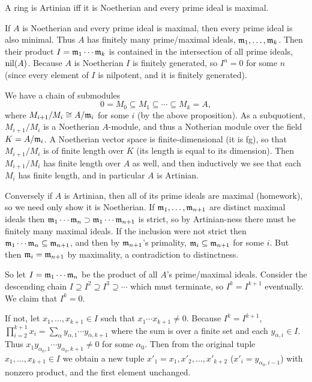 \eproof

\bprop

    A ring is Artinian iff it is Noetherian and every prime ideal is maximal.

\eprop

\bproof

    If $A$ is Noetherian and every prime ideal is maximal, then every prime ideal is also minimal.
    Thus $A$ has finitely many prime/maximal ideals, ${{\frak m}}_1,\dots,{{\frak m}}_k$.
    Then their product $I={{\frak m}}_1\cdots{{\frak m}}_k$ is contained in the intersection of all prime ideals, ${\rm nil}(A)$.
    Because $A$ is Noetherian $I$ is finitely generated, so $I^n=0$ for some $n$ (since every element of $I$ is nilpotent, and it is finitely generated).

    We have a chain of submodules
    $$ 0 = M_0 \subseteq M_1 \subseteq \cdots \subseteq M_k = A , $$
    where $M_{i+1}/M_i\cong A/{{\frak m}}_i$ for some $i$ (by the above proposition).
    As a subquotient, $M_{i+1}/M_i$ is a Noetherian $A$-module, and thus a Notherian module over the field $K=A/{{\frak m}}_i$.
    A Noetherian vector space is finite-dimensional (it is fg), so that $M_{i+1}/M_i$ is of finite length over $K$ (its length is equal to its dimension).
    Then $M_{i+1}/M_i$ has finite length over $A$ as well, and then inductively we see that each $M_i$ has finite length, and in particular $A$ is Artinian.

    Conversely if $A$ is Artinian, then all of its prime ideals are maximal (homework), so we need only show it is Noetherian.
    If ${{\frak m}}_1,\dots,{{\frak m}}_{n+1}$ are distinct maximal ideals then ${{\frak m}}_1\cdots{{\frak m}}_n\supset{{\frak m}}_1\cdots{{\frak m}}_{n+1}$ is strict, so by Artinian-ness there must be finitely many maximal ideals.
    If the inclusion were not strict then ${{\frak m}}_1\cdots{{\frak m}}_n\subseteq{{\frak m}}_{n+1}$, and then by ${{\frak m}}_{n+1}$'s primality, ${{\frak m}}_i\subseteq{{\frak m}}_{n+1}$ for some $i$.
    But then ${{\frak m}}_i={{\frak m}}_{n+1}$ by maximality, a contradiction to distinctness.

    So let $I={{\frak m}}_1\cdots{{\frak m}}_n$ be the product of all $A$'s prime/maximal ideals.
    Consider the descending chain $I\supseteq I^2\supseteq I^3\supseteq\cdots$ which must terminate, so $I^k=I^{k+1}$ eventually.
    We claim that $I^k=0$.

    If not, let $x_1,\dots,x_{k+1}\in I$ such that $x_1\cdots x_{k+1}\neq 0$.
    Because $I^k=I^{k+1}$, $\prod_{i=2}^{k+1}x_i=\sum_\alpha y_{\alpha,1}\cdots y_{\alpha,k+1}$ where the sum is over a finite set and each $y_{\alpha,i}\in I$.
    Thus $x_1y_{\alpha_0,1}\cdots y_{\alpha_0,k+1}\neq0$ for some $\alpha_0$.
    Then from the original tuple $x_1,\dots,x_{k+1}\in I$ we obtain a new tuple $x'_1=x_1,x'_2,\dots,x'_{k+2}$ ($x'_i=y_{\alpha_0,i-1}$) with nonzero product, and the first element unchanged.

